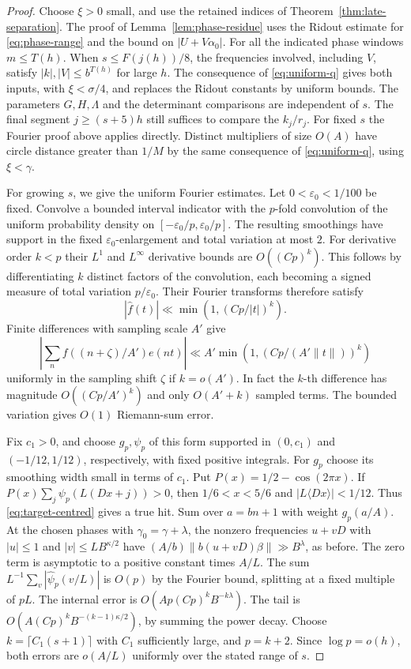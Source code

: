 \begin{proof}
Choose \(\xi>0\) small, and use the retained indices of
Theorem~\ref{thm:late-separation}. The proof of
Lemma~\ref{lem:phase-residue} uses the Ridout estimate for
\eqref{eq:phase-range} and the bound on \(|U+V\alpha_0|\).
For all the indicated phase windows \(m\le T(h)\). When
\(s\le F(j(h))/8\), the frequencies involved, including \(V\),
satisfy \(|k|,|V|\le b^{T(h)}\) for large \(h\).
The consequence of \eqref{eq:uniform-q} gives both inputs,
with \(\xi<\sigma/4\), and replaces the Ridout constants by uniform
bounds. The parameters \(G,H,\Lambda\) and the determinant
comparisons are independent of \(s\). The final segment
\(j\ge(s+5)h\) still suffices to compare the \(k_j/r_j\).
For fixed \(s\) the Fourier proof above applies directly.
Distinct multipliers of size \(O(A)\) have circle distance
greater than \(1/M\) by the same consequence of \eqref{eq:uniform-q},
using \(\xi<\gamma\).

For growing \(s\), we give the uniform Fourier estimates.
Let \(0<\varepsilon_0<1/100\) be fixed. Convolve a bounded
interval indicator with the \(p\)-fold convolution of the
uniform probability density on
\([-\varepsilon_0/p,\varepsilon_0/p]\).
The resulting smoothings have support in the fixed
\(\varepsilon_0\)-enlargement and total variation at most \(2\).
For derivative order \(k<p\) their \(L^1\) and \(L^\infty\)
derivative bounds are \(O((C p)^k)\). This follows by
differentiating \(k\) distinct factors of the convolution, each
becoming a signed measure of total variation \(p/\varepsilon_0\).
Their Fourier transforms therefore satisfy
\[
 |\widehat f(t)|\ll \min(1,(Cp/|t|)^k).
\]
Finite differences with sampling scale \(A'\) give
\[
 \left|\sum_n f((n+\zeta)/A')e(nt)\right|
   \ll A'\min(1,(Cp/(A'\|t\|))^k)
\]
uniformly in the sampling shift \(\zeta\) if \(k=o(A')\).
In fact the \(k\)-th difference has magnitude
\(O((Cp/A')^k)\) and only \(O(A'+k)\) sampled terms.
The bounded variation gives \(O(1)\) Riemann-sum error.

Fix \(c_1>0\), and choose \(g_p,\psi_p\) of this form
supported in \((0,c_1)\) and \((-1/12,1/12)\), respectively,
with fixed positive integrals. For \(g_p\) choose its smoothing
width small in terms of \(c_1\). Put \(P(x)=1/2-\cos(2\pi x)\).
If \(P(x)\sum_{j}\psi_p(L(Dx+j))>0\), then
\(1/6<x<5/6\) and \(|L\langle Dx\rangle|<1/12\).
Thus \eqref{eq:target-centred} gives a true hit.
Sum over \(a=bn+1\) with weight \(g_p(a/A)\).
At the chosen phases with \(\gamma_0=\gamma+\lambda\), the
nonzero frequencies \(u+vD\) with \(|u|\le1\) and
\(|v|\le LB^{\kappa/2}\) have
\((A/b)\|b(u+vD)\beta\|\gg B^\lambda\), as before.
The zero term is asymptotic to a positive constant times \(A/L\).
The sum \(L^{-1}\sum_v|\widehat\psi_p(v/L)|\) is \(O(p)\)
by the Fourier bound, splitting at a fixed multiple of \(pL\).
The internal error is \(O(Ap(Cp)^k B^{-k\lambda})\).
The tail is \(O(A(Cp)^k B^{-(k-1)\kappa/2})\),
by summing the power decay. Choose
\(k=\lceil C_1(s+1)\rceil\) with \(C_1\) sufficiently large, and
\(p=k+2\). Since \(\log p=o(h)\), both errors are \(o(A/L)\)
uniformly over the stated range of \(s\).


\end{proof}
